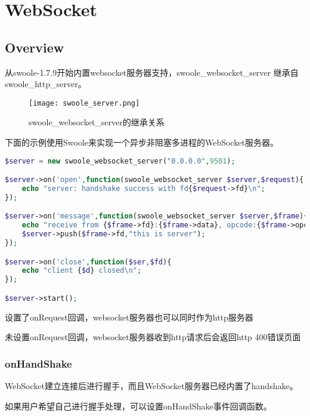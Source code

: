 \part{WebSocket}



\chapter{Overview}


从swoole-1.7.9开始内置websocket服务器支持，swoole\_websocket\_server 继承自 swoole\_http\_server。

\begin{figure}[htbp]
\centering
\texttt{[image: swoole\_server.png]}
\caption{swoole\_websocket\_server的继承关系}
\end{figure}



下面的示例使用Swoole来实现一个异步非阻塞多进程的WebSocket服务器。

\begin{lstlisting}[language=PHP]
$server = new swoole_websocket_server("0.0.0.0",9501);

$server->on('open',function(swoole_websocket_server $server,$request){
	echo "server: handshake success with fd{$request->fd}\n";
});

$server->on('message',function(swoole_websocket_server $server,$frame){
	echo "receive from {$frame->fd}:{$frame->data}, opcode:{$frame->opcode},fin:{$frame->finish}\n"
	$server->push($frame->fd,"this is server");
});

$server->on('close',function($ser,$fd){
	echo "client {$d} closed\n";
});

$server->start();
\end{lstlisting}

\begin{compactitem}
\item 设置了onRequest回调，websocket服务器也可以同时作为http服务器
\item 未设置onRequest回调，websocket服务器收到http请求后会返回http 400错误页面
\end{compactitem}

\section{onHandShake}

WebSocket建立连接后进行握手，而且WebSocket服务器已经内置了handshake。

如果用户希望自己进行握手处理，可以设置onHandShake事件回调函数。





